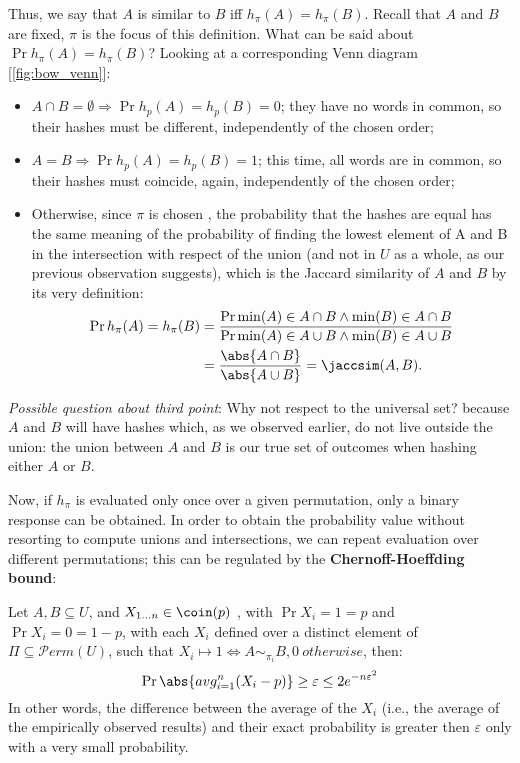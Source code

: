Thus, we say that $A$ is similar to $B$ iff $h_\pi(A)=h_\pi(B)$.
Recall that $A$ and $B$ are fixed, $\pi$ is the focus of this definition. What can be said about $\Pr{h_\pi(A)=h_\pi(B)}$? Looking at a corresponding Venn diagram [\ref{fig:bow_venn}]:
\begin{itemize}
\item $A \cap B = \emptyset \Rightarrow \Pr{h_p(A)=h_p(B)} = 0$; they have no words in common, so their hashes must be different, independently of the chosen order;
\item $A = B \Rightarrow \Pr{h_p(A)=h_p(B)} = 1$; this time, all words are in common, so their hashes must coincide, again, independently of the chosen order;
\item Otherwise, since $\pi$ is chosen \uar, the probability that the hashes are equal has the same meaning of the probability of finding the lowest element of A and B in the intersection with respect of the union (and not in $U$ as a whole, as our previous observation suggests), which is the Jaccard similarity of $A$ and $B$ by its very definition:
\begin{align*}
	\Pr{h_\pi(A)=h_\pi(B)} &= \frac{\Pr{\min(A) \in A \cap B \wedge \min(B) \in A \cap B}}{\Pr{\min(A) \in A \cup B \wedge \min(B) \in A \cup B}}\\
	&= \frac{\abs{A \cap B}}{\abs{A \cup B}} = \jaccsim(A, B).
\end{align*}
\end{itemize}

\textit{Possible question about third point}: Why not respect to the universal set? because $A$ and $B$ will have hashes which, as we observed earlier, do not live outside the union: the union between $A$ and $B$ is our true set of outcomes when hashing either $A$ or $B$.

Now, if $h_\pi$ is evaluated only once over a given permutation, only a binary response can be obtained. In order to obtain the probability value without resorting to compute unions and intersections, we can repeat evaluation over different permutations; this can be regulated by the \textbf{Chernoff-Hoeffding bound}:

Let $A, B \subseteq U$, and $X_{1 \dots n} \in \coin(p)$ \iid, with $\Pr{X_i=1}=p$ and $\Pr{X_i=0}=1-p$, with each $X_i$ defined over a distinct element of $\Pi \subseteq \mathcal{P}erm(U)$, such that $X_i \mapsto 1 \Leftrightarrow A \sim_{\pi_i} B, 0\ otherwise$, then:
\begin{equation} \label{chernoff_hoeffding}
\Pr{\abs{avg_{i=1}^{n}(X_i - p)}\geq\varepsilon} \leq 2e^{-n\varepsilon^2}
\end{equation}
In other words, the difference between the average of the $X_i$ (i.e., the average of the empirically observed results) and their exact probability is greater then $\varepsilon$ only with a very small probability.

